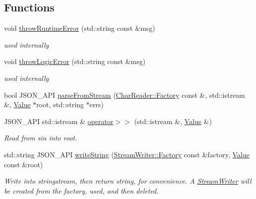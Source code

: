 \subsection*{Functions}
\begin{DoxyCompactItemize}
\item 
\mbox{\label{namespace_json_a97f039a107b3f6cf1c3edee50e978f76}} 
void \hyperlink{namespace_json_a97f039a107b3f6cf1c3edee50e978f76}{throw\+Runtime\+Error} (std\+::string const \&msg)
\begin{DoxyCompactList}\small\item\em used internally \end{DoxyCompactList}\item 
\mbox{\label{namespace_json_a27613326e9e36bbfe04a905ac90caa91}} 
void \hyperlink{namespace_json_a27613326e9e36bbfe04a905ac90caa91}{throw\+Logic\+Error} (std\+::string const \&msg)
\begin{DoxyCompactList}\small\item\em used internally \end{DoxyCompactList}\item 
bool J\+S\+O\+N\+\_\+\+A\+PI \hyperlink{namespace_json_acfebeaf759a841173ddce34c4da22486}{parse\+From\+Stream} (\hyperlink{class_json_1_1_char_reader_1_1_factory}{Char\+Reader\+::\+Factory} const \&, std\+::istream \&, \hyperlink{class_json_1_1_value}{Value} $\ast$root, std\+::string $\ast$errs)
\item 
J\+S\+O\+N\+\_\+\+A\+PI std\+::istream \& \hyperlink{namespace_json_a4d245ef719cc0853e8e78eb5f99c16e5}{operator$>$$>$} (std\+::istream \&, \hyperlink{class_json_1_1_value}{Value} \&)
\begin{DoxyCompactList}\small\item\em Read from \textquotesingle{}sin\textquotesingle{} into \textquotesingle{}root\textquotesingle{}. \end{DoxyCompactList}\item 
\mbox{\label{namespace_json_afd767fe4c7e962d0ff3d1a6d1622619f}} 
std\+::string J\+S\+O\+N\+\_\+\+A\+PI \hyperlink{namespace_json_afd767fe4c7e962d0ff3d1a6d1622619f}{write\+String} (\hyperlink{class_json_1_1_stream_writer_1_1_factory}{Stream\+Writer\+::\+Factory} const \&factory, \hyperlink{class_json_1_1_value}{Value} const \&root)
\begin{DoxyCompactList}\small\item\em Write into stringstream, then return string, for convenience. A \hyperlink{class_json_1_1_stream_writer}{Stream\+Writer} will be created from the factory, used, and then deleted. \end{DoxyCompactList}\item 

\end{DoxyCompactItemize}
